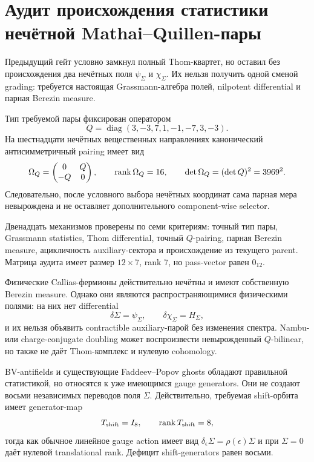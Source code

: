 \chapter{Аудит происхождения статистики нечётной Mathai--Quillen-пары}
\label{ch:v10-h15-r2-mathai-quillen-odd-pair-statistics-audit}

Предыдущий гейт условно замкнул полный Thom-квартет, но оставил без
происхождения два нечётных поля $\psi_\Sigma$ и $\chi_\Sigma$. Их нельзя
получить одной сменой grading: требуется настоящая Grassmann-алгебра полей,
nilpotent differential и парная Berezin measure.

Тип требуемой пары фиксирован оператором
\begin{equation}
 Q=\operatorname{diag}(3,-3,7,1,-1,-7,3,-3).
\end{equation}
На шестнадцати нечётных вещественных направлениях канонический
антисимметричный pairing имеет вид
\begin{equation}
 \Omega_Q=
 \begin{pmatrix}0&Q\\-Q&0\end{pmatrix},
 \qquad
 \operatorname{rank}\Omega_Q=16,
 \qquad
 \det\Omega_Q=(\det Q)^2=3969^2.
\end{equation}
Следовательно, после условного выбора нечётных координат сама парная мера
невырождена и не оставляет дополнительного component-wise selector.

Двенадцать механизмов проверены по семи критериям: точный тип пары,
Grassmann statistics, Thom differential, точный $Q$-pairing, парная
Berezin measure, ацикличность auxiliary-сектора и происхождение из текущего
parent. Матрица аудита имеет размер $12\times7$, rank $7$, но pass-vector
равен $0_{12}$.

Физические Callias-фермионы действительно нечётны и имеют собственную
Berezin measure. Однако они являются распространяющимися физическими
полями: на них нет differential
\begin{equation}
 \delta\Sigma=\psi_\Sigma,
 \qquad
 \delta\chi_\Sigma=H_\Sigma,
\end{equation}
и их нельзя объявить contractible auxiliary-парой без изменения спектра.
Nambu- или charge-conjugate doubling может воспроизвести невырожденный
$Q$-bilinear, но также не даёт Thom-комплекс и нулевую cohomology.

BV-antifields и существующие Faddeev--Popov ghosts обладают правильной
статистикой, но относятся к уже имеющимся gauge generators. Они не создают
восьми независимых переводов поля $\Sigma$. Действительно, требуемая
shift-орбита имеет generator-map
\begin{equation}
 T_{\rm shift}=I_8,
 \qquad \operatorname{rank} T_{\rm shift}=8,
\end{equation}
тогда как обычное линейное gauge action имеет вид
$\delta_\epsilon\Sigma=\rho(\epsilon)\Sigma$ и при $\Sigma=0$ даёт
нулевой translational rank. Дефицит shift-generators равен восьми.

